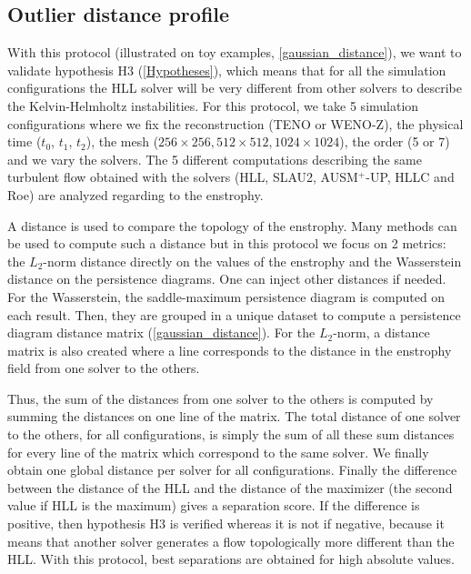 \subsection{Outlier distance profile}
\label{sec_outlier}
With this protocol (illustrated on toy examples,
\autoref{gaussian_distance}), we want to validate hypothesis H3 (\autoref{Hypotheses}), which means that for all the simulation configurations the HLL solver will be very different from other solvers to describe the Kelvin-Helmholtz instabilities. For this protocol, we take 5 simulation configurations where we fix the reconstruction (TENO or WENO-Z), the physical time ($t_0$, $t_1$, $t_2$), the mesh ($256\times 256, 512\times 512, 1024\times 1024$), the order (5 or 7) and we vary the solvers. The 5 different computations describing the same turbulent flow obtained with the solvers (HLL, SLAU2, AUSM$^+$-UP, HLLC and Roe) are analyzed regarding to the enstrophy.

A distance is used to compare the topology of the enstrophy. Many methods can be used to compute such a distance but in this protocol we focus on 2 metrics: the $L_2$-norm distance directly on the values of the enstrophy and the Wasserstein distance on the persistence diagrams. One can inject other distances if needed. For the Wasserstein, the saddle-maximum persistence diagram is computed on each result. Then, they are grouped in a unique dataset to compute a persistence diagram distance matrix (\autoref{gaussian_distance}). For the $L_2$-norm, a distance matrix  is also created where a line corresponds to the distance in the enstrophy field from one solver to the others.





Thus, the sum of the distances from one solver to the others is computed by
summing the distances on one line of the matrix. The total distance of one 
solver to the others, for all configurations, is simply the sum of all these sum 
distances for every line of the matrix which correspond to the same solver. We 
finally obtain one global distance per solver for all configurations. Finally 
the difference between the distance of the HLL and the distance of the maximizer 
(the second value if HLL is the maximum) gives a separation score. If the
difference is positive, then hypothesis H3 is verified whereas it is not if 
negative, because it means that another solver generates a flow topologically 
more different than the HLL. 
With this protocol, best separations are obtained for high absolute values.


